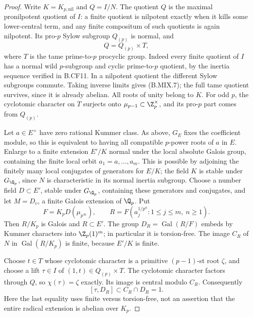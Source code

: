 \begin{proof}
Write \(K=K_{p,\mathrm{nil}}\) and \(Q=I/N\).
The quotient \(Q\) is the maximal pronilpotent quotient of
\(I\): a finite quotient is nilpotent exactly when it kills
some lower-central term, and any finite compositum of such
quotients is again nilpotent. Its pro-\(p\) Sylow subgroup
\(Q_{(p)}\) is normal, and
\[
                    Q=Q_{(p)}\times T,
                                                        \tag{B.MIX.7}
\]
where \(T\) is the tame prime-to-\(p\) procyclic group.
Indeed every finite quotient of \(I\) has a normal wild
\(p\)-subgroup and cyclic prime-to-\(p\) quotient, by the
inertia sequence verified in B.CF11. In a nilpotent quotient
the different Sylow subgroups commute. Taking inverse limits
gives (B.MIX.7); the full tame quotient survives, since it
is already abelian. All roots of unity belong to \(K\).
For odd \(p\), the cyclotomic character on \(T\) surjects
onto \(\mu_{p-1}\subset\Z_p^\times\), and its pro-\(p\)
part comes from \(Q_{(p)}\).

Let \(a\in E^\times\) have zero rational Kummer class.
As above, \(G_E\) fixes the coefficient module, so this is
equivalent to having all compatible \(p\)-power roots of
\(a\) in \(E\). Enlarge to a finite extension \(E'/K\)
normal under the local absolute Galois group, containing the
finite local orbit \(a_1=a,\ldots,a_m\). This is possible
by adjoining the finitely many local conjugates of generators
for \(E/K\); the field \(K\) is stable under \(G_{\Q_p}\),
since \(N\) is characteristic in its normal inertia subgroup.
Choose a number field \(D\subset E'\), stable under
\(G_{\Q_p}\), containing these generators and conjugates,
and let \(M=D_v\), a finite Galois extension of \(\Q_p\).
Put
\[
 F=K_pD(\mu_{p^\infty}),\qquad
 R=F(a_j^{1/p^n}:1\leq j\leq m,\ n\geq1).
\]
Then \(R/K_p\) is Galois and \(R\subset E'\).
The group \(D_R=\operatorname{Gal}(R/F)\) embeds by
Kummer characters into \(\Z_p(1)^m\); in particular it is
torsion-free. The image \(C_R\) of \(N\) in
\(\operatorname{Gal}(R/K_p)\) is finite, because
\(E'/K\) is finite.

Choose \(t\in T\) whose cyclotomic character is a primitive
\((p-1)\)-st root \(\zeta\), and choose a lift
\(\tau\in I\) of \((1,t)\in Q_{(p)}\times T\).
The cyclotomic character factors through \(Q\), so
\(\chi(\tau)=\zeta\) exactly. Its image is central modulo
\(C_R\). Consequently
\[
             [\tau,D_R]\subset C_R\cap D_R=1.           \tag{B.MIX.8}
\]
Here the last equality uses finite versus torsion-free, not
an assertion that the entire radical extension is abelian
over \(K_p\).


\end{proof}
